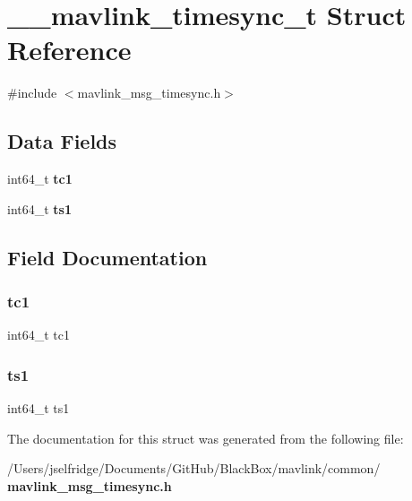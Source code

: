 \section{\+\_\+\+\_\+mavlink\+\_\+timesync\+\_\+t Struct Reference}
\label{struct____mavlink__timesync__t}


{\ttfamily \#include $<$mavlink\+\_\+msg\+\_\+timesync.\+h$>$}

\subsection*{Data Fields}
\begin{DoxyCompactItemize}
\item 
int64\+\_\+t \textbf{ tc1}
\item 
int64\+\_\+t \textbf{ ts1}
\end{DoxyCompactItemize}


\subsection{Field Documentation}
\mbox{\label{struct____mavlink__timesync__t_a11d3cffb2f8b77b57a1a77748ca4f543}} 
\subsubsection{tc1}
{\footnotesize\ttfamily int64\+\_\+t tc1}

\mbox{\label{struct____mavlink__timesync__t_a6e882f2a69b7dde201b7653a8e88aa3f}} 
\subsubsection{ts1}
{\footnotesize\ttfamily int64\+\_\+t ts1}



The documentation for this struct was generated from the following file\+:\begin{DoxyCompactItemize}
\item 
/\+Users/jselfridge/\+Documents/\+Git\+Hub/\+Black\+Box/mavlink/common/\textbf{ mavlink\+\_\+msg\+\_\+timesync.\+h}\end{DoxyCompactItemize}
